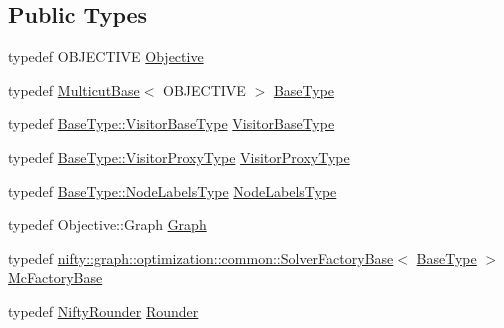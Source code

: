 \subsection*{Public Types}
\begin{DoxyCompactItemize}
\item 
typedef O\+B\+J\+E\+C\+T\+I\+V\+E \hyperlink{classnifty_1_1graph_1_1optimization_1_1multicut_1_1MulticutMp_ad37cbde154954a78f5529f35def24443}{Objective}
\item 
typedef \hyperlink{classnifty_1_1graph_1_1optimization_1_1multicut_1_1MulticutBase}{Multicut\+Base}$<$ O\+B\+J\+E\+C\+T\+I\+V\+E $>$ \hyperlink{classnifty_1_1graph_1_1optimization_1_1multicut_1_1MulticutMp_aa1b1a033f9090852c7c4529eec9623ef}{Base\+Type}
\item 
typedef \hyperlink{classnifty_1_1graph_1_1optimization_1_1common_1_1SolverBase_a5a14d64c70a9cc0eebc7d71d2b089f9b}{Base\+Type\+::\+Visitor\+Base\+Type} \hyperlink{classnifty_1_1graph_1_1optimization_1_1multicut_1_1MulticutMp_ac0c55da1b0da06e56bc164f256e811e9}{Visitor\+Base\+Type}
\item 
typedef \hyperlink{classnifty_1_1graph_1_1optimization_1_1common_1_1SolverBase_a58913ea9ab9232ff72608b710c1012d0}{Base\+Type\+::\+Visitor\+Proxy\+Type} \hyperlink{classnifty_1_1graph_1_1optimization_1_1multicut_1_1MulticutMp_a5b2de2a593f41a26245d5c6d1514b94a}{Visitor\+Proxy\+Type}
\item 
typedef \hyperlink{classnifty_1_1graph_1_1optimization_1_1common_1_1SolverBase_a6e4e465f3b6e039882669fcfb9714818}{Base\+Type\+::\+Node\+Labels\+Type} \hyperlink{classnifty_1_1graph_1_1optimization_1_1multicut_1_1MulticutMp_a4f01b08f609bb54b19098452e1f8bef6}{Node\+Labels\+Type}
\item 
typedef Objective\+::\+Graph \hyperlink{classnifty_1_1graph_1_1optimization_1_1multicut_1_1MulticutMp_ac12f279cc1b42960983637364ed3bbdc}{Graph}
\item 
typedef \hyperlink{classnifty_1_1graph_1_1optimization_1_1common_1_1SolverFactoryBase}{nifty\+::graph\+::optimization\+::common\+::\+Solver\+Factory\+Base}$<$ \hyperlink{classnifty_1_1graph_1_1optimization_1_1multicut_1_1MulticutMp_aa1b1a033f9090852c7c4529eec9623ef}{Base\+Type} $>$ \hyperlink{classnifty_1_1graph_1_1optimization_1_1multicut_1_1MulticutMp_a43262185c61afcc95eb125ac9d6d0305}{Mc\+Factory\+Base}
\item 
typedef \hyperlink{structnifty_1_1graph_1_1optimization_1_1multicut_1_1MulticutMp_1_1NiftyRounder}{Nifty\+Rounder} \hyperlink{classnifty_1_1graph_1_1optimization_1_1multicut_1_1MulticutMp_a9f5b323f0e6ed2481e20fb12309b3451}{Rounder}

\end{DoxyCompactItemize}
